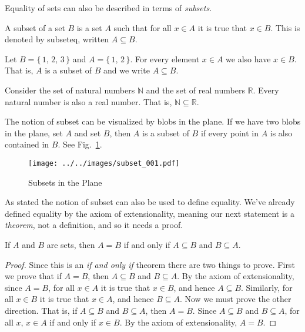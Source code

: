             Equality of sets can also be described in terms of
            \textit{subsets}.
            \begin{definition}
                A \gls{subset} of a set $B$ is a set $A$ such that for all
                $x\in{A}$ it is true that $x\in{B}$. This is denoted by
                \gls{subseteq}, written $A\subseteq{B}$.
            \end{definition}
            \begin{example}
                Let $B=\{\,1,\,2,\,3\,\}$ and $A=\{\,1,\,2\,\}$. For every
                element $x\in{A}$ we also have $x\in{B}$. That is,
                $A$ is a subset of $B$ and we write $A\subseteq{B}$.
            \end{example}
            \begin{example}
                Consider the set of natural numbers $\mathbb{N}$ and the set of
                real numbers $\mathbb{R}$. Every natural number is also a
                real number. That is, $\mathbb{N}\subseteq\mathbb{R}$.
            \end{example}
            The notion of subset can be visualized by blobs in the plane.
            If we have two blobs in the plane, set $A$ and set $B$, then $A$ is
            a subset of $B$ if every point in $A$ is also contained in $B$.
            See Fig.~\ref{fig:subsets_in_plane}.
            \begin{figure}
                \centering
                \texttt{[image: ../../images/subset\_001.pdf]}
                \caption{Subsets in the Plane}
                \label{fig:subsets_in_plane}
            \end{figure}
            \par\hfill\par
            As stated the notion of subset can also be used to define equality.
            We've already defined equality by the axiom of extensionality,
            meaning our next statement is a \textit{theorem}, not a definition,
            and so it needs a proof.
            \begin{theorem}
                If $A$ and $B$ are sets, then $A=B$ if and only if
                $A\subseteq{B}$ and $B\subseteq{A}$.
            \end{theorem}
            \begin{proof}
                Since this is an \textit{if and only if} theorem there are two
                things to prove. First we prove that if $A=B$, then
                $A\subseteq{B}$ and $B\subseteq{A}$. By the axiom of
                extensionality, since $A=B$,
                for all $x\in{A}$ it is true that $x\in{B}$, and hence
                $A\subseteq{B}$. Similarly, for all $x\in{B}$ it is true that
                $x\in{A}$, and hence $B\subseteq{A}$. Now we must prove the
                other direction. That is, if $A\subseteq{B}$ and
                $B\subseteq{A}$, then $A=B$. Since $A\subseteq{B}$ and
                $B\subseteq{A}$, for all $x$, $x\in{A}$ if and only if
                $x\in{B}$. By the axiom of extensionality, $A=B$.
            \end{proof}
